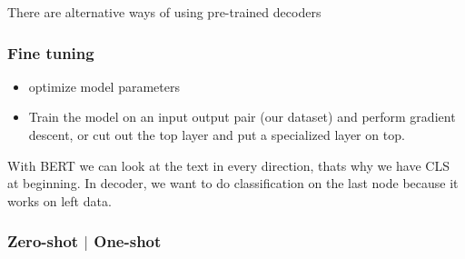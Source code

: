 \documentclass[11pt]{article}
\begin{document}
There are alternative ways of using pre-trained decoders

\subsubsection{Fine tuning}

\begin{minipage}[l]{.5\linewidth}
    \begin{figure}[H]
        \centering
    \end{figure}    
\end{minipage}\hfill
\begin{minipage}[r]{.48\linewidth}
    \begin{itemize}
        \item optimize model parameters
        \item Train the model on an input output pair (our dataset) and perform gradient descent, or cut out the top layer and put a specialized layer on top.
    \end{itemize}
\end{minipage}

\begin{figure}[H]
    \centering
\end{figure}    

With BERT we can look at the text in every direction, thats why we have CLS at beginning. In decoder, we want to do classification on the last node because it works on left data.

\subsubsection{Zero-shot $\vert$ One-shot}
\end{document}
